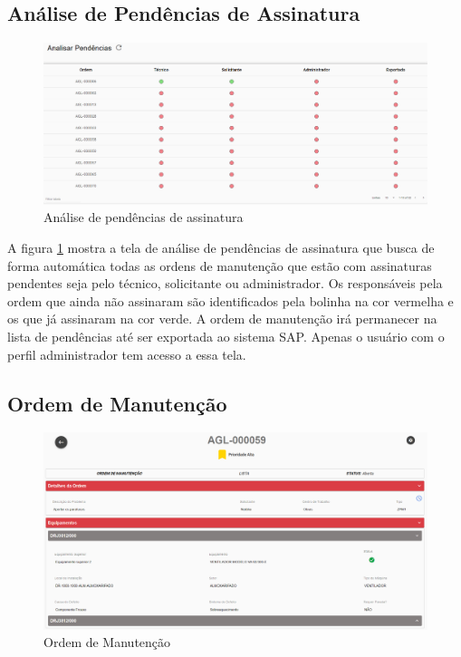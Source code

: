 \subsection{Análise de Pendências de Assinatura}

\begin{figure}[H]
	\caption{\label{web-pendencias}Análise de pendências de assinatura}
	\begin{center}
		\includegraphics[scale=0.34]{./Figuras/agil.it/web-pendencias.png}
	\end{center}
\end{figure}

A figura \ref{web-pendencias} mostra a tela de análise de pendências de assinatura que busca de forma automática todas as ordens de manutenção que estão com assinaturas pendentes seja pelo técnico, solicitante ou administrador. Os responsáveis pela ordem que ainda não assinaram são identificados pela bolinha na cor vermelha e os que já assinaram na cor verde. A ordem de manutenção irá permanecer na lista de pendências até ser exportada ao sistema SAP.
Apenas o usuário com o perfil administrador tem acesso a essa tela.

\subsection{Ordem de Manutenção}

\begin{figure}[H]
	\caption{\label{web-om}Ordem de Manutenção}
	\begin{center}
		\includegraphics[scale=0.34]{./Figuras/agil.it/web-om.png}
	\end{center}
\end{figure}


